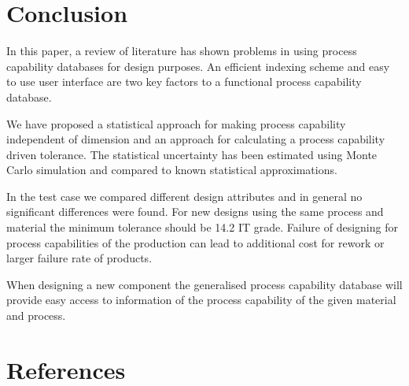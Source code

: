 \documentclass[aip,amsmath, reprint, author-year]{revtex4-1}
\begin{document}
\section{Conclusion}
In this paper, a review of literature has shown problems in using process capability databases for design purposes. An efficient indexing scheme and easy to use user interface are two key factors to a functional process capability database.

We have proposed a statistical approach for making process capability independent of dimension and an approach for calculating a process capability driven tolerance. The statistical uncertainty has been estimated using Monte Carlo simulation and compared to known statistical approximations.

In the test case we compared different design attributes and in general no significant differences were found. For new designs using the same process and material the minimum tolerance should be 14.2 IT grade. Failure of designing for process capabilities of the production can lead to additional cost for rework or larger failure rate of products.

When designing a new component the generalised process capability database will provide easy access to information of the process capability of the given material and process.

\section*{References}

\end{document}
